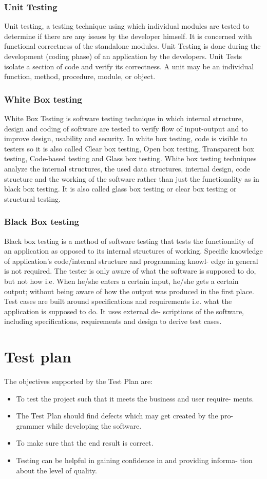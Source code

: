 \documentclass[12pt]{article}
\begin{document}
\subsubsection{Unit Testing}
Unit testing, a testing technique using which individual modules are tested
to determine if there are any issues by the developer himself. It is concerned
with functional correctness of the standalone modules. Unit Testing is done
during the development (coding phase) of an application by the developers.
Unit Tests isolate a section of code and verify its correctness. A unit may be
an individual function, method, procedure, module, or object.
\subsubsection{White Box testing}
White Box Testing is software testing technique in which internal structure,
design and coding of software are tested to verify flow of input-output and to
improve design, usability and security. In white box testing, code is visible to
testers so it is also called Clear box testing, Open box testing, Transparent
box testing, Code-based testing and Glass box testing. White box testing
techniques analyze the internal structures, the used data structures, internal
design, code structure and the working of the software rather than just the
functionality as in black box testing. It is also called glass box testing or
clear box testing or structural testing.
\subsubsection{Black Box testing}
Black box testing is a method of software testing that tests the functionality
of an application as opposed to its internal structures of working. Specific
knowledge of application’s code/internal structure and programming knowl-
edge in general is not required. The tester is only aware of what the software
is supposed to do, but not how i.e. When he/she enters a certain input,
he/she gets a certain output; without being aware of how the output was
produced in the first place. Test cases are built around specifications and
requirements i.e. what the application is supposed to do. It uses external de-
scriptions of the software, including specifications, requirements and design
to derive test cases.
\pagebreak
\section{Test plan}
The objectives supported by the Test Plan are:
\begin{itemize}
	\item To test the project such that it meets the business and user require-
	ments.
	 \item The Test Plan should find defects which may get created by the pro-
	 grammer while developing the software.
	\item To make sure that the end result is correct.
	\item Testing can be helpful in gaining confidence in and providing informa-
	tion about the level of quality.
\end{itemize}
\end{document}
